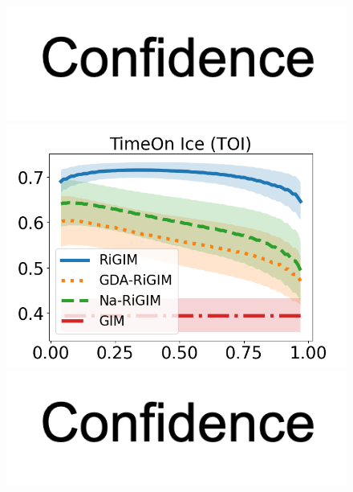 \documentclass{article}
\begin{document}
\begin{figure}[htbp]
\begin{minipage}{0.16\textwidth}
    \vspace{-0.05in}
    \includegraphics[scale=0.15]{figures/confidence_x_label.png}
    \end{minipage}
    \begin{minipage}{0.16\textwidth}
    \centering
    \includegraphics[scale=0.17]{figures/risk_curve_GP_shadow.png}\par
    \vspace{-0.05in}
    \includegraphics[scale=0.15]{figures/confidence_x_label.png}
    \end{minipage}
    \begin{minipage}{0.16\textwidth}
    \centering

\end{minipage}
\end{figure}
\end{document}
